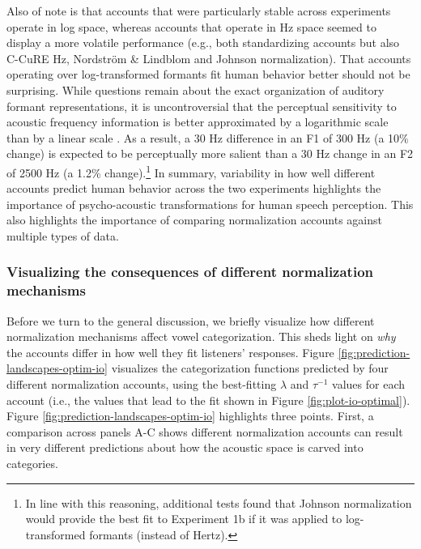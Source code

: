 \documentclass[preprint]{JASA}
\begin{document}
Also of note is that accounts that were particularly stable across experiments operate in log space, whereas accounts that operate in Hz space seemed to display a more volatile performance (e.g., both standardizing accounts but also C-CuRE Hz, Nordström \& Lindblom and Johnson normalization). That accounts operating over log-transformed formants fit human behavior better should not be surprising. While questions remain about the exact organization of auditory formant representations, it is uncontroversial that the perceptual sensitivity to acoustic frequency information is better approximated by a logarithmic scale than by a linear scale \citep[see][]{moore2012}. As a result, a 30 Hz difference in an F1 of 300 Hz (a 10\% change) is expected to be perceptually more salient than a 30 Hz change in an F2 of 2500 Hz (a 1.2\% change).\footnote{In line with this reasoning, additional tests found that Johnson normalization would provide the best fit to Experiment 1b if it was applied to log-transformed formants (instead of Hertz).} In summary, variability in how well different accounts predict human behavior across the two experiments highlights the importance of psycho-acoustic transformations for human speech perception. This also highlights the importance of comparing normalization accounts against multiple types of data.

\subsubsection{Visualizing the consequences of different normalization mechanisms}\label{sec:visualizing-consequences}

Before we turn to the general discussion, we briefly visualize how different normalization mechanisms affect vowel categorization. This sheds light on \emph{why} the accounts differ in how well they fit listeners' responses. Figure \ref{fig:prediction-landscapes-optim-io} visualizes the categorization functions predicted by four different normalization accounts, using the best-fitting \(\lambda\) and \(\tau^{-1}\) values for each account (i.e., the values that lead to the fit shown in Figure \ref{fig:plot-io-optimal}). Figure \ref{fig:prediction-landscapes-optim-io} highlights three points. First, a comparison across panels A-C shows different normalization accounts can result in very different predictions about how the acoustic space is carved into categories.
\end{document}
